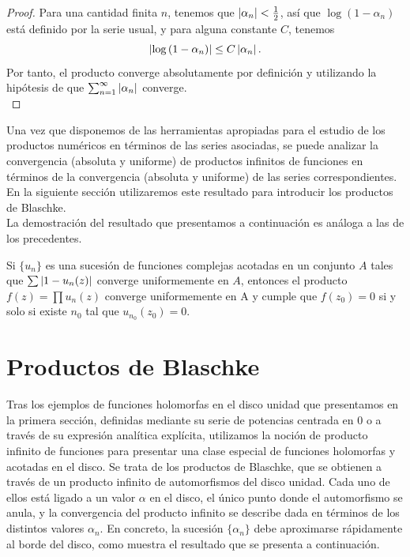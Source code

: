 \begin{proof}
    Para una cantidad finita $n$, tenemos que $\left\lvert\alpha_n\right\rvert < \frac{1}{2}$, así que $\log{(1 - \alpha_n)}$ está definido por la serie usual, y para alguna constante $C$, tenemos
    \begin{equation*}
        \left\lvert\log{(1 - \alpha_n)}\right\rvert \leq C \left\lvert\alpha_n\right\rvert.
    \end{equation*}
    Por tanto, el producto converge absolutamente por definición y utilizando la hipótesis de que $\sum_{n=1}^{\infty} \left\lvert\alpha_n\right\rvert$ converge. \\
\end{proof}

Una vez que disponemos de las herramientas apropiadas para el estudio de los productos numéricos en términos de las series asociadas, se puede analizar la convergencia (absoluta y uniforme) de productos infinitos de funciones en términos de la convergencia (absoluta y uniforme) de las series correspondientes. En la siguiente sección utilizaremos este resultado para introducir los productos de Blaschke. \\

La demostración del resultado que presentamos a continuación es análoga a las de los precedentes. \\

\begin{theorem}
    Si $\{u_n\}$ es una sucesión de funciones complejas acotadas en un conjunto $A$ tales que $\sum \left\lvert1-u_n(z)\right\rvert$ converge uniformemente en  $A$, entonces el producto $f(z) = \prod u_n(z)$ converge uniformemente en A y cumple que $f(z_0) = 0$ si y solo si existe $n_0$ tal que $u_{n_0}(z_0) = 0$.
\end{theorem}

\section{Productos de Blaschke}

Tras los ejemplos de funciones holomorfas en el disco unidad que presentamos en la primera sección, definidas mediante su serie de potencias centrada en 0 o a través de su expresión analítica explícita, utilizamos la noción de producto infinito de funciones para presentar una clase especial de funciones holomorfas y acotadas en el disco. Se trata de los productos de Blaschke, que se obtienen a través de un producto infinito de automorfismos del disco unidad. Cada uno de ellos está ligado a un valor $\alpha$ en el disco, el único punto donde el automorfismo se anula, y la convergencia del producto infinito se describe dada en términos de los distintos valores $\alpha_n$. En concreto, la sucesión $\{\alpha_n\}$ debe aproximarse rápidamente al borde del disco, como muestra el resultado que se presenta a continuación. \\

